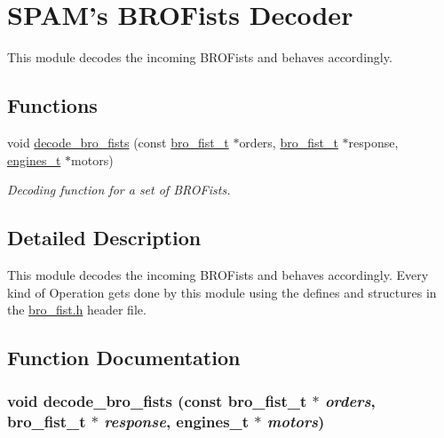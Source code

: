\hypertarget{group___b_r_o_s_fists}{
\section{SPAM's BROFists Decoder}
\label{group___b_r_o_s_fists}
}


This module decodes the incoming BROFists and behaves accordingly.  


\subsection*{Functions}
\begin{DoxyCompactItemize}
\item 
void \hyperlink{group___b_r_o_s_fists_gae0a1fa9c2e435b1ecf7c2d43e48d8326}{decode\_\-bro\_\-fists} (const \hyperlink{structbro__fist__t}{bro\_\-fist\_\-t} $\ast$orders, \hyperlink{structbro__fist__t}{bro\_\-fist\_\-t} $\ast$response, \hyperlink{structengines__t}{engines\_\-t} $\ast$motors)
\begin{DoxyCompactList}\small\item\em Decoding function for a set of BROFists. \item\end{DoxyCompactList}\end{DoxyCompactItemize}


\subsection{Detailed Description}
This module decodes the incoming BROFists and behaves accordingly. Every kind of Operation gets done by this module using the defines and structures in the \hyperlink{bro__fist_8h}{bro\_\-fist.h} header file. 

\subsection{Function Documentation}
\hypertarget{group___b_r_o_s_fists_gae0a1fa9c2e435b1ecf7c2d43e48d8326}{
\subsubsection[{decode\_\-bro\_\-fists}]{\setlength{\rightskip}{0pt plus 5cm}void decode\_\-bro\_\-fists (const {\bf bro\_\-fist\_\-t} $\ast$ {\em orders}, \/  {\bf bro\_\-fist\_\-t} $\ast$ {\em response}, \/  {\bf engines\_\-t} $\ast$ {\em motors})}}
\label{group___b_r_o_s_fists_gae0a1fa9c2e435b1ecf7c2d43e48d8326}


